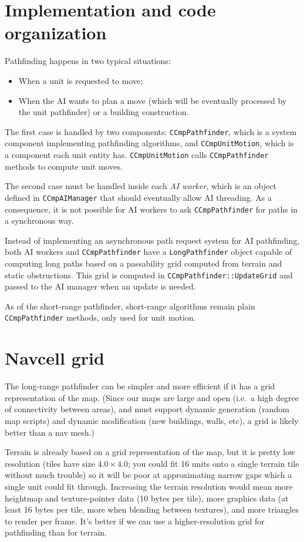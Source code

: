 \documentclass[a4paper,10pt]{article}
\begin{document}
\section{Implementation and code organization}

Pathfinding happens in two typical situations:
\begin{itemize}
\item When a unit is requested to move;
\item When the AI wants to plan a move (which will be eventually processed by the unit pathfinder) or a building construction.
\end{itemize}

The first case is handled by two components: \texttt{CCmpPathfinder}, which is a system component implementing pathfinding algorithms, and \texttt{CCmpUnitMotion}, which is a component each unit entity has. \texttt{CCmpUnitMotion} calls \texttt{CCmpPathfinder} methods to compute unit moves.

The second case must be handled inside each \emph{AI worker}, which is an object defined in \texttt{CCmpAIManager} that should eventually allow AI threading. As a consequence, it is not possible for AI workers to ask \texttt{CCmpPathfinder} for paths in a synchronous way.

Instead of implementing an asynchronous path request system for AI pathfinding, both AI workers and \texttt{CCmpPathfinder} have a \texttt{LongPathfinder} object capable of computing long paths based on a passability grid computed from terrain and static obstructions. This grid is computed in \texttt{CCmpPathfinder::UpdateGrid} and passed to the AI manager when an update is needed.

As of the short-range pathfinder, short-range algorithms remain plain \texttt{CCmpPathfinder} methods, only used for unit motion.

\section{Navcell grid}

The long-range pathfinder can be simpler and more efficient if it has a
grid representation of the map.
(Since our maps are large and open (i.e.\ a high degree of connectivity
between areas), and must support dynamic generation (random map scripts)
and dynamic modification (new buildings, walls, etc),
a grid is likely better than a nav mesh.)

Terrain is already based on a grid representation of the map,
but it is pretty low resolution (tiles have size $4.0 \times 4.0$;
you could fit 16 units onto a single terrain tile without much trouble)
so it will be poor at approximating narrow gaps which a single unit could fit through.
Increasing the terrain resolution would mean more heightmap and texture-pointer data
(10 bytes per tile),
more graphics data
(at least 16 bytes per tile, more when blending between textures),
and more triangles to render per frame.
It's better if we can use a higher-resolution grid for pathfinding than for terrain.
\end{document}
